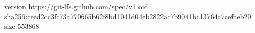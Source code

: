 version https://git-lfs.github.com/spec/v1
oid sha256:ceed2cc3fc73a770665b62f8bd1041d04eb2822ac7b9041bc13764a7cefaeb20
size 553868
